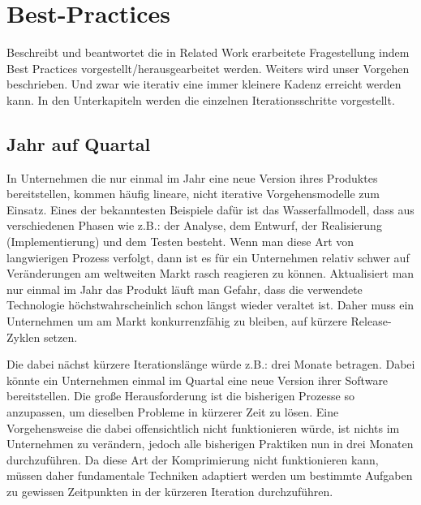 \section{Best-Practices}
\label{sec:best-practices}

\begin{wichtigbox}
Beschreibt und beantwortet die in Related Work erarbeitete Fragestellung indem
Best Practices vorgestellt/herausgearbeitet werden. Weiters wird unser
Vorgehen beschrieben. Und zwar wie iterativ eine immer kleinere Kadenz
erreicht werden kann. In den Unterkapiteln werden die einzelnen
Iterationsschritte vorgestellt.
\end{wichtigbox}

\subsection{Jahr auf Quartal}
\label{subsec:jahr-auf-quartal}

In Unternehmen die nur einmal im Jahr eine neue Version ihres Produktes
bereitstellen, kommen häufig lineare, nicht iterative Vorgehensmodelle zum
Einsatz. Eines der bekanntesten Beispiele dafür ist das Wasserfallmodell, dass
aus verschiedenen Phasen wie z.B.: der Analyse, dem Entwurf, der Realisierung
(Implementierung) und dem Testen besteht. Wenn man diese Art von langwierigen
Prozess verfolgt, dann ist es für ein Unternehmen relativ schwer auf
Veränderungen am weltweiten Markt rasch reagieren zu können. Aktualisiert man
nur einmal im Jahr das Produkt läuft man Gefahr, dass die verwendete
Technologie höchstwahrscheinlich schon längst wieder veraltet ist. Daher muss
ein Unternehmen um am Markt konkurrenzfähig zu bleiben, auf kürzere Release-
Zyklen setzen.

Die dabei nächst kürzere Iterationslänge würde z.B.: drei Monate betragen.
Dabei könnte ein Unternehmen einmal im Quartal eine neue Version ihrer
Software bereitstellen. Die große Herausforderung ist die bisherigen Prozesse
so anzupassen, um dieselben Probleme in kürzerer Zeit zu lösen. Eine
Vorgehensweise die dabei offensichtlich nicht funktionieren würde, ist nichts
im Unternehmen zu verändern, jedoch alle bisherigen Praktiken nun in drei
Monaten durchzuführen. Da diese Art der Komprimierung nicht funktionieren
kann, müssen daher fundamentale Techniken adaptiert werden um bestimmte
Aufgaben zu gewissen Zeitpunkten in der kürzeren Iteration durchzuführen.

